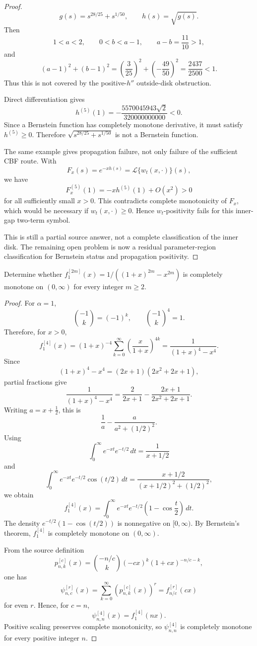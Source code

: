 \begin{proof}
\[
g(s)=s^{28/25}+s^{1/50},\qquad h(s)=\sqrt{g(s)}.
\]
Then
\[
1<a<2,\qquad 0<b<a-1,\qquad a-b=\frac{11}{10}>1,
\]
and
\[
(a-1)^2+(b-1)^2
=\left(\frac3{25}\right)^2+\left(-\frac{49}{50}\right)^2
=\frac{2437}{2500}<1.
\]
Thus this is not covered by the positive-\(h''\) outside-disk obstruction.

Direct differentiation gives
\[
h^{(5)}(1)
=-\frac{5570045943\sqrt2}{320000000000}<0.
\]
Since a Bernstein function has completely monotone derivative, it must satisfy \(h^{(5)}\ge0\). Therefore \(\sqrt{s^{28/25}+s^{1/50}}\) is not a Bernstein function.

The same example gives propagation failure, not only failure of the sufficient CBF route. With
\[
F_x(s)=e^{-xh(s)}=\mathcal L\{w_t(x,\cdot)\}(s),
\]
we have
\[
F_x^{(5)}(1)=-x h^{(5)}(1)+O(x^2)>0
\]
for all sufficiently small \(x>0\). This contradicts complete monotonicity of \(F_x\), which would be necessary if \(w_t(x,\cdot)\ge0\). Hence \(w_t\)-positivity fails for this inner-gap two-term symbol.

This is still a partial source answer, not a complete classification of the inner disk. The remaining open problem is now a residual parameter-region classification for Bernstein status and propagation positivity.
\end{proof}

\begin{lemma}
\label{res:baskakov-alpha1-even-r-frontier-open}
Determine whether \(f^{[2m]}_1(x)=1/((1+x)^{2m}-x^{2m})\) is completely monotone on \((0,\infty)\) for every integer \(m\ge2\).
\end{lemma}
\begin{proof}
For \(\alpha=1\),
\[
\binom{-1}{k}=(-1)^k,
\qquad
\binom{-1}{k}^{4}=1.
\]
Therefore, for \(x>0\),
\[
f^{[4]}_1(x)
=(1+x)^{-4}\sum_{k=0}^{\infty}
\left(\frac{x}{1+x}\right)^{4k}
=\frac{1}{(1+x)^4-x^4}.
\]
Since
\[
(1+x)^4-x^4=(2x+1)(2x^2+2x+1),
\]
partial fractions give
\[
\frac{1}{(1+x)^4-x^4}
=\frac{2}{2x+1}-\frac{2x+1}{2x^2+2x+1}.
\]
Writing \(a=x+\frac12\), this is
\[
\frac{1}{a}-\frac{a}{a^2+(1/2)^2}.
\]
Using
\[
\int_0^\infty e^{-xt}e^{-t/2}\,dt=\frac{1}{x+1/2}
\]
and
\[
\int_0^\infty e^{-xt}e^{-t/2}\cos(t/2)\,dt
=\frac{x+1/2}{(x+1/2)^2+(1/2)^2},
\]
we obtain
\[
f^{[4]}_1(x)
=\int_0^\infty e^{-xt}e^{-t/2}\left(1-\cos\frac{t}{2}\right)\,dt.
\]
The density \(e^{-t/2}(1-\cos(t/2))\) is nonnegative on \([0,\infty)\). By Bernstein's theorem, \(f^{[4]}_1\) is completely monotone on \((0,\infty)\).

From the source definition
\[
p^{[c]}_{n,k}(x)=\binom{-n/c}{k}(-cx)^k(1+cx)^{-n/c-k},
\]
one has
\[
\psi^{[r]}_{n,c}(x)=\sum_{k=0}^{\infty}\left(p^{[c]}_{n,k}(x)\right)^r
=f^{[r]}_{n/c}(cx)
\]
for even \(r\). Hence, for \(c=n\),
\[
\psi^{[4]}_{n,n}(x)=f^{[4]}_1(nx).
\]
Positive scaling preserves complete monotonicity, so \(\psi^{[4]}_{n,n}\) is completely monotone for every positive integer \(n\).
\end{proof}

